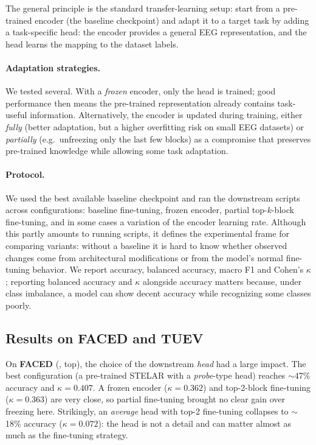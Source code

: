 \documentclass[11pt]{article}
\begin{document}
The general principle is the standard transfer-learning setup: start from a
pre-trained encoder (the baseline checkpoint) and adapt it to a target task by
adding a task-specific head: the encoder provides a general EEG representation,
and the head learns the mapping to the dataset labels.

\paragraph{Adaptation strategies.} We tested several. With a \emph{frozen}
encoder, only the head is trained; good performance then means the pre-trained
representation already contains task-useful information. Alternatively, the encoder
is updated during training, either \emph{fully} (better adaptation, but a higher
overfitting risk on small EEG datasets) or \emph{partially} (e.g.\ unfreezing only
the last few blocks) as a compromise that preserves pre-trained knowledge while
allowing some task adaptation.

\paragraph{Protocol.} We used the best available baseline checkpoint and ran the
downstream scripts across configurations: baseline fine-tuning, frozen encoder,
partial top-$k$-block fine-tuning, and in some cases a variation of the encoder
learning rate. Although this partly amounts to running scripts, it defines the
experimental frame for comparing variants: without a baseline it is hard to know
whether observed changes come from architectural modifications or from the model's
normal fine-tuning behavior. We report accuracy, balanced accuracy, macro F1 and
Cohen's $\kappa$; reporting balanced accuracy and $\kappa$ alongside accuracy
matters because, under class imbalance, a model can show decent accuracy while
recognizing some classes poorly.

\subsection{Results on FACED and TUEV}
On \textbf{FACED} (, top), the choice of the downstream
\emph{head} had a large impact. The best configuration (a pre-trained STELAR with
a \emph{probe}-type head) reaches $\sim$47\% accuracy and $\kappa=0.407$. A frozen
encoder ($\kappa=0.362$) and top-2-block fine-tuning ($\kappa=0.363$) are very
close, so partial fine-tuning brought no clear gain over freezing here.
Strikingly, an \emph{average} head with top-2 fine-tuning collapses to $\sim$18\%
accuracy ($\kappa=0.072$): the head is not a detail and can matter almost as much
as the fine-tuning strategy.
\end{document}
